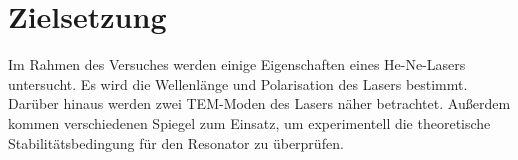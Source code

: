 \section{Zielsetzung}
\label{sec:Zielsetzung}

Im Rahmen des Versuches werden einige Eigenschaften eines He-Ne-Lasers untersucht. 
Es wird die Wellenlänge und Polarisation des Lasers bestimmt. 
Darüber hinaus werden zwei TEM-Moden des Lasers näher betrachtet. Außerdem kommen verschiedenen Spiegel zum Einsatz, 
um experimentell die theoretische Stabilitätsbedingung für den Resonator zu überprüfen. 

